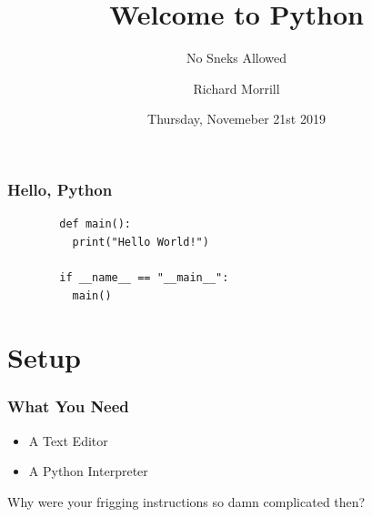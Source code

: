 \documentclass{beamer}
\title{Welcome to Python}
\subtitle{No Sneks Allowed}
\author{Richard Morrill}
\institute{Fordham University CS Society}
\date{Thursday, Novemeber 21st 2019}
\begin{document}
\begin{frame}
	\titlepage
		    
\end{frame}
\begin{frame}[fragile]
	\frametitle{Hello, Python}
	\begin{verbatim}
		def main():
		  print("Hello World!")
				        
		if __name__ == "__main__":
		  main()
	\end{verbatim}
\end{frame}

\section{Setup}
\begin{frame}
  \frametitle{What You Need}
  \begin{itemize}
    \item A Text Editor
    \item A Python Interpreter
  \end{itemize}
  \pause
  Why were your frigging instructions so damn complicated then?
\end{frame}
\end{document}
